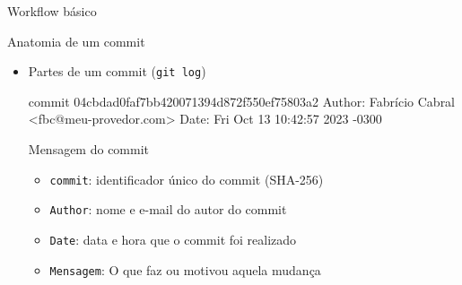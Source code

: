 \documentclass[aspectratio=169,14pt]{beamer}
\begin{document}
\begin{frame}[fragile]{Workflow básico}
\end{frame}

\begin{frame}[fragile]{Anatomia de um commit}
    \begin{itemize}
        \item Partes de um commit (\texttt{git log})
        \begin{bashcode}
            commit 04cbdad0faf7bb420071394d872f550ef75803a2
            Author: Fabrício Cabral <fbc@meu-provedor.com>
            Date:   Fri Oct 13 10:42:57 2023 -0300
            
                Mensagem do commit
        \end{bashcode}
        \begin{itemize}
            \item \texttt{commit}: identificador único do commit (SHA-256)
            \item \texttt{Author}: nome e e-mail do autor do commit
            \item \texttt{Date}: data e hora que o commit foi realizado
            \item \texttt{Mensagem}: O que faz ou motivou aquela mudança
        \end{itemize}
    \end{itemize}
\end{frame}
\end{document}

